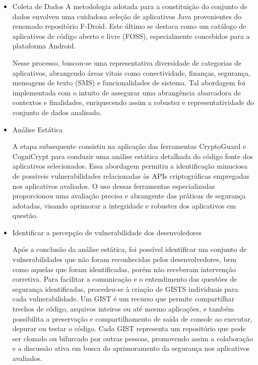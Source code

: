 \begin{itemize}
\item{Coleta de Dados}
A metodologia adotada para a constituição do conjunto de dados envolveu uma cuidadosa seleção de aplicativos Java provenientes do renomado repositório F-Droid. \cite{perception_developers} Este último se destaca como um catálogo de aplicativos de código aberto e livre (FOSS), especialmente concebidos para a plataforma Android.

Nesse processo, buscou-se uma representativa diversidade de categorias de aplicativos, abrangendo áreas vitais como conectividade, finanças, segurança, mensagens de texto (SMS) e funcionalidades de sistema. Tal abordagem foi implementada com o intuito de assegurar uma abrangência abarcadora de contextos e finalidades, enriquecendo assim a robustez e representatividade do conjunto de dados analisado.

\item{Análise Estática}

A etapa subsequente consistiu na aplicação das ferramentas CryptoGuard e CogniCrypt para conduzir uma análise estática detalhada do código fonte dos aplicativos selecionados. Essa abordagem permitiu a identificação minuciosa de possíveis vulnerabilidades relacionadas às APIs criptográficas empregadas nos aplicativos avaliados. O uso dessas ferramentas especializadas proporcionou uma avaliação precisa e abrangente das práticas de segurança adotadas, visando aprimorar a integridade e robustez dos aplicativos em questão.

\item{Identificar a percepção de vulnerabilidade dos desenvoledores}

Após a conclusão da análise estática, foi possível identificar um conjunto de vulnerabilidades que não foram reconhecidas pelos desenvolvedores, bem como aquelas que foram identificadas, porém não receberam intervenção corretiva. Para facilitar a comunicação e o entendimento das questões de segurança identificadas, procedeu-se à criação de GISTS individuais para cada vulnerabilidade.  \cite{perception_developers}  Um GIST é um recurso que permite compartilhar trechos de código, arquivos inteiros ou até mesmo aplicações, e também possibilita a preservação e compartilhamento de saída de console ao executar, depurar ou testar o código. Cada GIST representa um repositório que pode ser clonado ou bifurcado por outras pessoas, promovendo assim a colaboração e a discussão ativa em busca do aprimoramento da segurança nos aplicativos avaliados.


\end{itemize}
